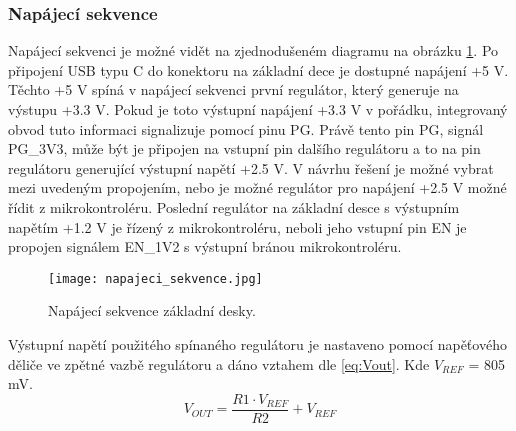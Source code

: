	\subsubsection{Napájecí sekvence}
	Napájecí sekvenci je možné vidět na zjednodušeném diagramu na obrázku \ref{fig:napajeci_sekvecne}. Po připojení USB typu C do konektoru na základní dece je dostupné napájení +5 V. Těchto +5 V spíná v napájecí sekvenci první regulátor, který generuje na výstupu +3.3 V. Pokud je toto výstupní napájení +3.3 V v pořádku, integrovaný obvod tuto informaci signalizuje pomocí pinu PG. Právě tento pin PG, signál PG\_3V3, může být je připojen na vstupní pin dalšího regulátoru a to na pin regulátoru generující výstupní napětí +2.5 V. V návrhu řešení je možné vybrat mezi uvedeným propojením, nebo je možné regulátor pro napájení +2.5 V možné řídit z mikrokontroléru. Poslední regulátor na základní desce s výstupním napětím +1.2 V je řízený z mikrokontroléru, neboli jeho vstupní pin EN je propojen signálem EN\_1V2 s výstupní bránou mikrokontroléru.
	\begin{figure}[h!]
		\centering
		\captionsetup{justification=centering}
		\texttt{[image: napajeci\_sekvence.jpg]}
		\caption{Napájecí sekvence základní desky.} 
		\label{fig:napajeci_sekvecne}
	\end{figure}
	\par Výstupní napětí použitého spínaného regulátoru je nastaveno pomocí napěťového děliče ve zpětné vazbě regulátoru a dáno vztahem dle \ref{eq:Vout}. Kde $V_{REF}$ = 805 mV.
	\begin{equation}
		V_{OUT} = \frac{R1 \cdot V_{REF}}{R2} + V_{REF}
		\label{eq:Vout}
	\end{equation}

